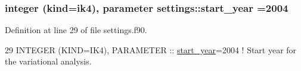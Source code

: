 \subsubsection[{\texorpdfstring{start\+\_\+year}{start_year}}]{\setlength{\rightskip}{0pt plus 5cm}integer (kind=ik4), parameter settings\+::start\+\_\+year =2004}\hypertarget{namespacesettings_a6feb18d2b9a31062fd7bc3f5533b0a4f}{}\label{namespacesettings_a6feb18d2b9a31062fd7bc3f5533b0a4f}


Definition at line 29 of file settings.\+f90.


\begin{DoxyCode}
29 \textcolor{keywordtype}{INTEGER (KIND=IK4)}, \textcolor{keywordtype}{PARAMETER}   :: \hyperlink{namespacesettings_a6feb18d2b9a31062fd7bc3f5533b0a4f}{start\_year}=2004          \textcolor{comment}{! Start year for the variational
       analysis.}
\end{DoxyCode}
